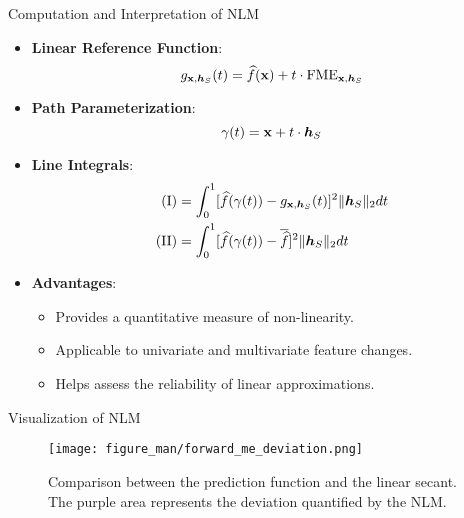 \documentclass[10pt,compress,t,notes=noshow, xcolor=table]{beamer}
\newcommand{\boldhS}{\bm{h}_{S}}
\begin{document}
\begin{frame}{Computation and Interpretation of NLM}
\begin{itemize}
\item \textbf{Linear Reference Function}:
\[
g_{\xv, \boldhS}(t) = \widehat{f}(\xv) + t \cdot \text{FME}_{\xv, \boldhS}
\]
\item \textbf{Path Parameterization}:
\[
\gamma(t) = \xv + t \cdot \boldhS
\]
\item \textbf{Line Integrals}:
\begin{align*}
\text{(I)} &= \int_0^1 [\widehat{f}(\gamma(t)) - g_{\xv, \boldhS}(t)]^2 \Vert \boldhS \Vert_2 dt \\
\text{(II)} &= \int_0^1 [\widehat{f}(\gamma(t)) - \overline{\widehat{f}}]^2 \Vert \boldhS \Vert_2 dt
\end{align*}
\item \textbf{Advantages}:
\begin{itemize}
\item Provides a quantitative measure of non-linearity.
\item Applicable to univariate and multivariate feature changes.
\item Helps assess the reliability of linear approximations.
\end{itemize}
\end{itemize}
\end{frame}

\begin{frame}{Visualization of NLM}
\begin{figure}
  \centering
  \texttt{[image: figure\_man/forward\_me\_deviation.png]}
  \caption{Comparison between the prediction function and the linear secant. The purple area represents the deviation quantified by the NLM.}
\end{figure}
\end{frame}

\end{document}
